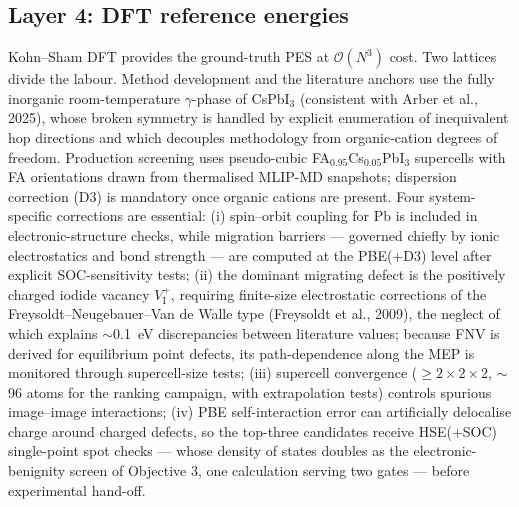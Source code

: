 \documentclass[11pt,a4paper]{article}
\begin{document}
\subsection{Layer 4: DFT reference energies}
Kohn--Sham DFT provides the ground-truth PES at $\mathcal{O}(N^3)$ cost. Two lattices
divide the labour. Method development and the literature anchors use the fully
inorganic room-temperature $\gamma$-phase of CsPbI$_3$ (consistent with Arber et al.,
2025), whose broken symmetry is handled by explicit enumeration of inequivalent hop
directions and which decouples methodology from organic-cation degrees of freedom.
Production screening uses pseudo-cubic FA$_{0.95}$Cs$_{0.05}$PbI$_3$ supercells with
FA orientations drawn from thermalised MLIP-MD snapshots; dispersion correction (D3)
is mandatory once organic cations are present. Four system-specific corrections are
essential: (i) spin--orbit coupling for Pb is included in electronic-structure checks,
while migration barriers --- governed chiefly by ionic electrostatics and bond strength
--- are computed at the PBE(+D3) level after explicit SOC-sensitivity tests; (ii) the
dominant migrating defect is the positively charged iodide vacancy
$V_{\mathrm{I}}^{+}$, requiring finite-size electrostatic corrections of the
Freysoldt--Neugebauer--Van de Walle type (Freysoldt et al., 2009), the neglect of which
explains $\sim$0.1~eV discrepancies between literature values; because FNV is derived
for equilibrium point defects, its path-dependence along the MEP is monitored through
supercell-size tests; (iii) supercell convergence ($\geq2\times2\times2$, $\sim$96
atoms for the ranking campaign, with extrapolation tests) controls spurious
image--image interactions; (iv) PBE self-interaction error can artificially delocalise
charge around charged defects, so the top-three candidates receive HSE(+SOC)
single-point spot checks --- whose density of states doubles as the
electronic-benignity screen of Objective 3, one calculation serving two gates ---
before experimental hand-off.
\end{document}
